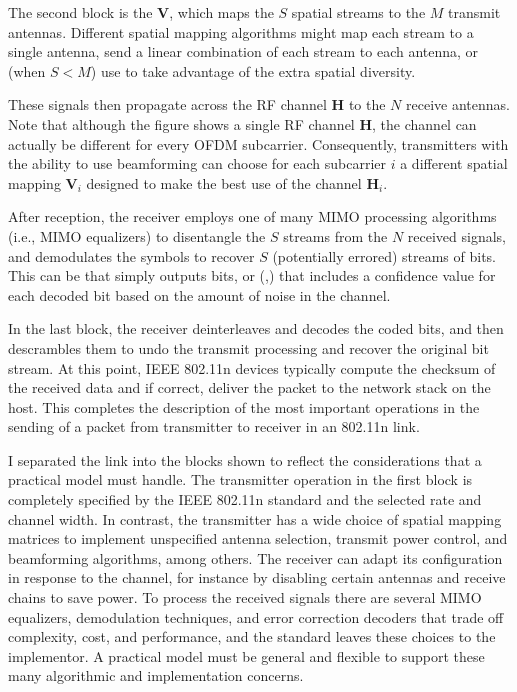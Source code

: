 The second block is the  $\mathbf{V}$, which maps the $S$ spatial streams to the $M$ transmit antennas. Different spatial mapping algorithms might map each stream to a single antenna, send a linear combination of each stream to each antenna, or (when $S<M$) use  to take advantage of the extra spatial diversity.

These signals then propagate across the RF channel $\mathbf{H}$ to the $N$ receive antennas. Note that although the figure shows a single RF channel $\mathbf{H}$, the channel can actually be different for every OFDM subcarrier. Consequently, transmitters with the ability to use beamforming can choose for each subcarrier $i$ a different spatial mapping $\mathbf{V}_i$ designed to make the best use of the channel $\mathbf{H}_i$.

After reception, the receiver employs one of many MIMO processing algorithms (i.e., MIMO equalizers) to disentangle the $S$ streams from the $N$ received signals, and demodulates the symbols to recover $S$ (potentially errored) streams of bits. This can be  that simply outputs bits, or  (\cite[\S5.3.1.3]{Sklar},\cite{Jamieson_PPR}) that includes a confidence value for each decoded bit based on the amount of noise in the channel.

In the last block, the receiver deinterleaves and decodes the coded bits, and then descrambles them to undo the transmit processing and recover the original bit stream. At this point, IEEE 802.11n devices typically compute the checksum of the received data and if correct, deliver the packet to the network stack on the host. This completes the description of the most important operations in the sending of a packet from transmitter to receiver in an 802.11n link.

I separated the link into the blocks shown to reflect the considerations that a practical model must handle. The transmitter operation in the first block is completely specified by the IEEE 802.11n standard and the selected rate and channel width. In contrast, the transmitter has a wide choice of spatial mapping matrices to implement unspecified antenna selection, transmit power control, and beamforming algorithms, among others. The receiver can adapt its configuration in response to the channel, for instance by disabling certain antennas and receive chains to save power. To process the received signals there are several MIMO equalizers, demodulation techniques, and error correction decoders that trade off complexity, cost, and performance, and the standard leaves these choices to the implementor. A practical model must be general and flexible to support these many algorithmic and implementation concerns.

